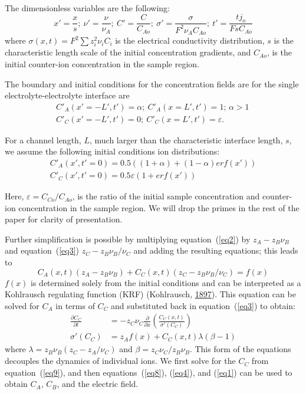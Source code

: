 \documentclass[lineno,authoryear]{FLO_v1}%
\theoremstyle{definition}
\begin{document}
The dimensionless variables are the following:
\begin{equation}\label{eq5}
{x}'=\frac{x}{s};\ {\nu }'=\frac{\nu }{\nu _A };\ {C}'=\frac{C}{C_{Ao} };\
{\sigma }'=\frac{\sigma }{F^2\nu _A C_{Ao} };\ {t}'=\frac{tj_o }{FsC_{Ao}}
\end{equation}
where $\sigma (x,t)=F^2\sum {z_i^2 } \nu _i C_i $ is the electrical
conductivity distribution, $s$ is the characteristic length scale of the
initial concentration gradients, and $C_{Ao}$, is the initial counter-ion
concentration in the sample region.

The boundary and initial conditions for the concentration fields are for the
single electrolyte-electrolyte interface are
\begin{equation}\label{eq6}
\begin{split}
{C}'_A ({x}'=-{L}',{t}')=\alpha;\ {C}'_A (x={L}',{t}')=1;\,\alpha>1\, \\
{C}'_C ({x}'=-{L}',{t}')=0;\ {C}'_C (x={L}',{t}')=\varepsilon.
\end{split}
\end{equation}

For a channel length, $L$, much larger than the
characteristic interface length, $s$, we assume the
following initial conditions ion distributions:
\begin{equation}\label{eq7}
\begin{split}
 {C}'_A ({x}',{t}'=0)=0.5((1+\alpha )+(1-\alpha )erf({x}')) \\
 {C}'_C ({x}',{t}'=0)=0.5\varepsilon (1+erf({x}'))
 \end{split}
\end{equation}

Here, $\varepsilon=C_{Co}/C_{Ao}$, is the ratio of the
initial sample concentration and counter-ion concentration
in the sample region. We will drop the primes in the rest
of the paper for clarity of presentation.

Further simplification is possible by multiplying
equation~(\ref{eq2}) by $z_A -z_B \nu _B $ and
equation~(\ref{eq3}) $z_C -z_B \nu _B /\nu _C $ and adding
the resulting equations; this leads to
\begin{equation}\label{eq8}
C_A (x,t)(z_A -z_B \nu _B )+C_C (x,t)(z_C -z_B \nu _B /\nu
_C )=f(x)
\end{equation}
$f(x)$ is determined solely from the initial conditions and
can be interpreted as a Kohlrausch regulating function
(KRF) (Kohlrausch, \hyperlink{bib15}{1897}). This equation
can be solved for $C_{A}$ in terms of $C_{C}$ and
substituted back in equation~(\ref{eq3}) to obtain:
\begin{align}
\frac{\partial C_C }{\partial t}&=-z_C \nu _C \frac{\partial}{\partial x}\left(\frac{C_C (x,t)}{\sigma'(C_C)}\right)\label{eq9}\\
{\sigma }'(C_C )&=z_A f(x)+C_C (x,t)\lambda(\beta -1)\label{eq10}
\end{align}
where $\lambda =z_B \nu _B (z_C -z_A /\nu _C)$ and $\beta
=z_C \nu _C /z_B \nu _B$. This form of the equations
decouples the dynamics of individual ions. We first solve
for the $C_{C}$ from equation~(\ref{eq9}), and then
equations~(\ref{eq8}), (\ref{eq4}), and (\ref{eq1}) can be
used to obtain $C_{A}$, $C_{B}$, and the electric field.
\end{document}

